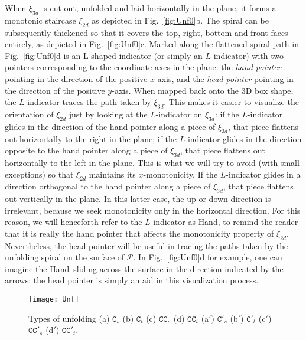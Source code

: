 \documentclass[11pt]{article}
\def\P{{\mathcal P}}
\def\c{\mathtt{C}}
\def\cc{\mathtt{CC}}
\newcommand\hand{{\sc Hand}}
\begin{document}
When $\xi_{3d}$ is cut out, unfolded and laid horizontally
in the plane, it forms a monotonic staircase $\xi_{2d}$ as depicted in Fig.~\ref{fig:Unf0}b. The spiral can be subsequently thickened so that it covers the top, right, bottom and front faces entirely, as depicted in Fig.~\ref{fig:Unf0}c. Marked along the flattened spiral path in Fig.~\ref{fig:Unf0}d is an L-shaped
indicator (or simply an $L$-indicator) with two pointers corresponding to the coordinate axes in the plane:
the \emph{hand pointer} pointing in the direction of the positive $x$-axis, and the
\emph{head pointer} pointing in the direction of the positive $y$-axis. When mapped back onto the
3D box shape, the $L$-indicator traces the path taken by $\xi_{3d}$. This makes it easier to visualize the orientation of $\xi_{2d}$ just by looking at the $L$-indicator on $\xi_{3d}$: if the $L$-indicator glides in the direction of the hand pointer along a piece of $\xi_{3d}$, that piece flattens out horizontally to the right in the plane; if the $L$-indicator glides in the direction opposite to the hand pointer along a piece of $\xi_{3d}$, that piece flattens out horizontally to the left in the plane. This is what we will try to avoid (with small exceptions) so that $\xi_{2d}$ maintains its $x$-monotonicity. If the $L$-indicator glides in a direction orthogonal to the hand pointer along a piece of $\xi_{3d}$, that piece flattens out vertically in the plane. In this latter case, the up or down direction is irrelevant, because we seek monotonicity only in the horizontal direction. For this reason, we will henceforth refer to the $L$-indicator as \hand, to remind the reader that it is really the hand pointer that affects the monotonicity property of $\xi_{2d}$. Nevertheless, the head pointer will be useful in tracing the paths taken by the unfolding spiral on the surface of $\P$. In Fig.~\ref{fig:Unf0}d for example, one can imagine the \hand\ sliding across the surface in the direction indicated by the arrows; the head pointer is simply an aid in this visualization process.

\begin{figure}[htbp]
\centering
\texttt{[image: Unf]}
\caption{Types of unfolding (a) $\c_{s}$ (b) $\c_{t}$ (c) $\cc_{s}$ (d) $\cc_{t}$ (a$'$) $\c'_{s}$ (b$'$) $\c'_{t}$ (c$'$) $\cc'_{s}$ (d$'$) $\cc'_{t}$.}
\label{fig:Unf}
\end{figure}
\end{document}

